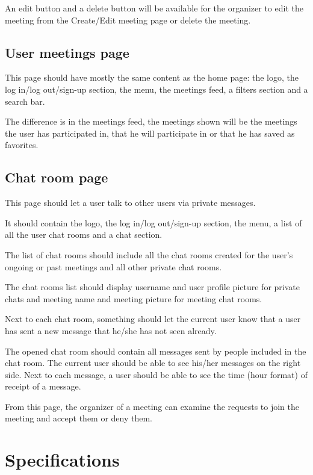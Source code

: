 \documentclass[conference]{IEEEtran}
\begin{document}
An edit button and a delete button will be available for the organizer to edit the meeting from the Create/Edit meeting page or delete the meeting.

\subsection{User meetings page}

This page should have mostly the same content as the home page: the logo, the log in/log out/sign-up section, the menu, the meetings feed, a filters section and a search bar.

The difference is in the meetings feed, the meetings shown will be the meetings the user has participated in, that he will participate in or that he has saved as favorites.

\subsection{Chat room page}

This page should let a user talk to other users via private messages.

It should contain the logo, the log in/log out/sign-up section, the menu, a list of all the user chat rooms and a chat section. 

The list of chat rooms should include all the chat rooms created for the user's ongoing or past meetings and all other private chat rooms.

The chat rooms list should display username and user profile picture for private chats and meeting name and meeting picture for meeting chat rooms. 

Next to each chat room, something should let the current user know that a user has sent a new message that he/she has not seen already.

The opened chat room should contain all messages sent by people included in the chat room. The current user should be able to see his/her messages on the right side. Next to each message, a user should be able to see the time (hour format) of receipt of a message.

From this page, the organizer of a meeting can examine the requests to join the meeting and accept them or deny them.

\section{Specifications}
\end{document}
